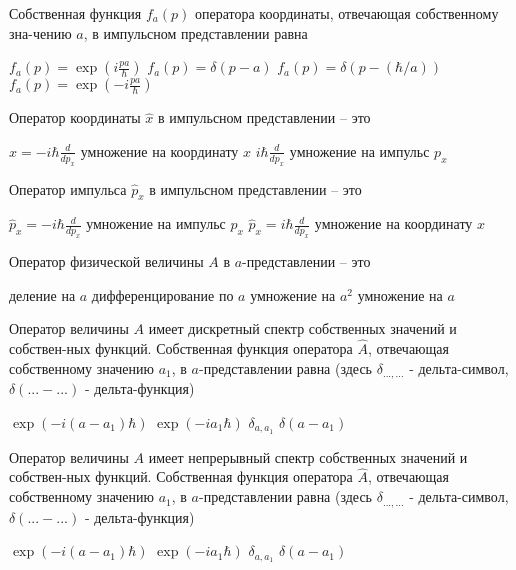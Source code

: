 \documentclass[11pt,a4paper]{exam}
\begin{document}
\begin{questions}
\question Собственная функция ${f_a}(p)$ оператора координаты, отвечающая собственному зна-чению $a$, в импульсном представлении равна
\begin{choices}
\choice ${f_a}(p) = \exp \left( {i\frac{{pa}}{\hbar }} \right)$      
\choice ${f_a}(p) = \delta \left( {p - a} \right)$
\choice ${f_a}(p) = \delta \left( {p - (\hbar /a)} \right)$    
\choice ${f_a}(p) = \exp \left( { - i\frac{{pa}}{\hbar }} \right)$
\end{choices}

\question Оператор координаты $\hat x$ в импульсном представлении – это
\begin{choices}
\choice $\hat x =  - i\hbar \frac{d}{{d{p_x}}}$       
\choice умножение на координату $x$
\choice $i\hbar \frac{d}{{d{p_x}}}$          
\choice умножение на импульс ${p_x}$
\end{choices}

\question Оператор импульса ${\hat p_x}$ в импульсном представлении – это
\begin{choices}
\choice ${\hat p_x} =  - i\hbar \frac{d}{{d{p_x}}}$         
\choice умножение на импульс ${p_x}$
\choice ${\hat p_x} = i\hbar \frac{d}{{d{p_x}}}$         
\choice умножение на координату $x$ 
\end{choices}

\question Оператор физической величины $A$ в $a$-представлении – это
\begin{choices}
\choice деление на $a$        
\choice дифференцирование по $a$
\choice умножение на ${a^2}$        
\choice умножение на $a$
\end{choices}

\question Оператор величины $A$ имеет дискретный спектр собственных значений и собствен-ных функций. Собственная функция оператора $\hat A$, отвечающая собственному значению ${a_1}$, в $a$-представлении равна (здесь ${\delta _{...,...}}$ - дельта-символ, $\delta (... - ...)$ - дельта-функция)
\begin{choices}
\choice $\exp ( - i(a - {a_1})\hbar )$          
\choice $\exp ( - i{a_1}\hbar )$
\choice ${\delta _{a,{a_1}}}$          
\choice $\delta (a - {a_1})$
\end{choices}

\question Оператор величины $A$ имеет непрерывный спектр собственных значений и собствен-ных функций. Собственная функция оператора $\hat A$, отвечающая собственному значению ${a_1}$, в $a$-представлении равна (здесь ${\delta _{...,...}}$ - дельта-символ, $\delta (... - ...)$ - дельта-функция)
\begin{choices}
\choice $\exp ( - i(a - {a_1})\hbar )$          
\choice $\exp ( - i{a_1}\hbar )$
\choice ${\delta _{a,{a_1}}}$          
\choice $\delta (a - {a_1})$
\end{choices}


\end{questions}
\end{document}
